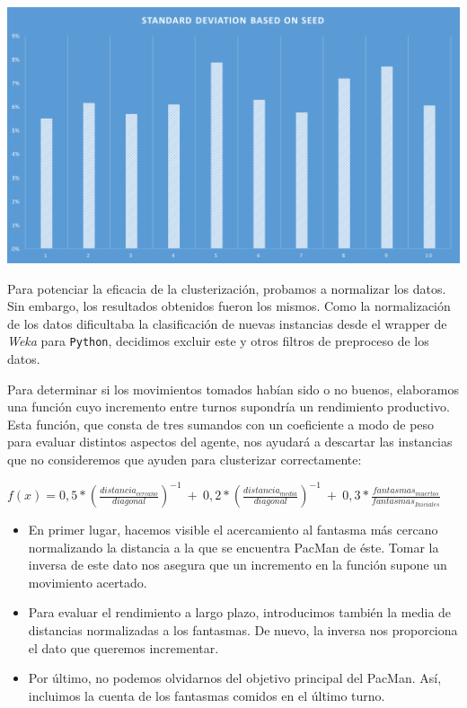 \documentclass[12pt]{article}
\begin{document}
\begin{center}
    \includegraphics[width=15cm]{stdff}
\end{center}


Para potenciar la eficacia de la clusterización, probamos a normalizar los datos. Sin embargo, los resultados obtenidos fueron los mismos. Como la normalización de los datos dificultaba la clasificación de nuevas instancias desde el wrapper de \textit{Weka} para \texttt{Python}, decidimos excluir este y otros filtros de preproceso de los datos.

Para determinar si los movimientos tomados habían sido o no buenos, elaboramos una función cuyo incremento entre turnos supondría un rendimiento productivo. Esta función, que consta de tres sumandos con un coeficiente a modo de peso para evaluar distintos aspectos del agente, nos ayudará a descartar las instancias que no consideremos que ayuden para clusterizar correctamente:

\begin{center}
    $ f(x) =  0,5*(\frac{distancia_{cercano}}{diagonal})^{-1}\ +\ 0,2*(\frac{distancia_{media}}{diagonal})^{-1}\ +\ 0,3*\frac{fantasmas_{muertos}}{fantasmas_{Iniciales}} $
\end{center}

\begin{itemize}
    \item En primer lugar, hacemos visible el acercamiento al fantasma más cercano normalizando la distancia a la que se encuentra PacMan de éste. Tomar la inversa de este dato nos asegura que un incremento en la función supone un movimiento acertado.
    \item Para evaluar el rendimiento a largo plazo, introducimos también la media de distancias normalizadas a los fantasmas. De nuevo, la inversa nos proporciona el dato que queremos incrementar.
    \item Por último, no podemos olvidarnos del objetivo principal del PacMan. Así, incluimos la cuenta de los fantasmas comidos en el último turno.
\end{itemize}
\end{document}
